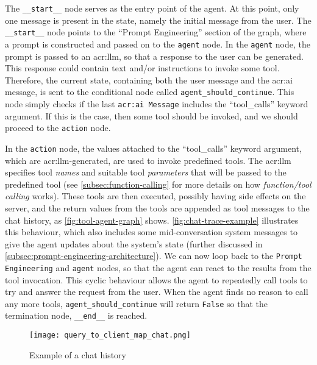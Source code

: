 The \texttt{\_\_start\_\_} node serves as the entry point of the agent. At this point, only one message is present in the state, namely the initial message from the user. The \texttt{\_\_start\_\_} node points to the \enquote{Prompt Engineering} section of the graph, where a prompt is constructed and passed on to the \texttt{agent} node. In the \texttt{agent} node, the prompt is passed to an \acrshort{acr:llm}, so that a response to the user can be generated. This response could contain text and/or instructions to invoke some tool. Therefore, the current state, containing both the user message and the \acrshort{acr:ai} message, is sent to the conditional node called \texttt{agent\_should\_continue}. This node simply checks if the last \texttt{\acrshort{acr:ai} Message} includes the \enquote{tool\_calls} keyword argument. If this is the case, then some tool should be invoked, and we should proceed to the \texttt{action} node.

In the \texttt{action} node, the values attached to the \enquote{tool\_calls} keyword argument, which are \acrshort{acr:llm}-generated, are used to invoke predefined tools. The \acrshort{acr:llm} specifies tool \textit{names} and suitable tool \textit{parameters} that will be passed to the predefined tool (see \autoref{subsec:function-calling} for more details on how \textit{function/tool calling} works). These tools are then executed, possibly having side effects on the server, and the return values from the tools are appended as tool messages to the chat history, as \autoref{fig:tool-agent-graph} shows. \autoref{fig:chat-trace-example} illustrates this behaviour, which also includes some mid-conversation system messages to give the agent updates about the system's state (further discussed in \autoref{subsec:prompt-engineering-architecture}). We can now loop back to the \texttt{Prompt Engineering} and \texttt{agent} nodes, so that the agent can react to the results from the tool invocation. This cyclic behaviour allows the agent to repeatedly call tools to try and answer the request from the user. When the agent finds no reason to call any more tools, \texttt{agent\_should\_continue} will return \texttt{False} so that the termination node, \texttt{\_\_end\_\_} is reached.

\begin{figure}
    \centering
    \texttt{[image: query\_to\_client\_map\_chat.png]}
    \caption{Example of a chat history}
    \label{fig:chat-trace-example}
\end{figure}


